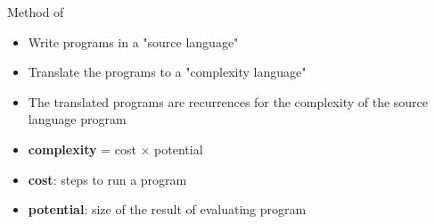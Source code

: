 \documentclass[pdf]{beamer}
\begin{document}
\begin{frame}{Method of \citet{Danner2015}}
  \begin{itemize}
    \item<1-> Write programs in a "source language"
    \vfill
    \item<1-> Translate the programs to a "complexity language"
    \vfill
    \item<1-> The translated programs are recurrences for the complexity of the source language program
    \vfill
    \item<1-> \textbf{complexity} = cost $\times$ potential
    \vfill
    \item<1-> \textbf{cost}: steps to run a program
    \vfill
    \item<1-> \textbf{potential}: size of the result of evaluating program
  \end{itemize}

\end{frame}
\end{document}
